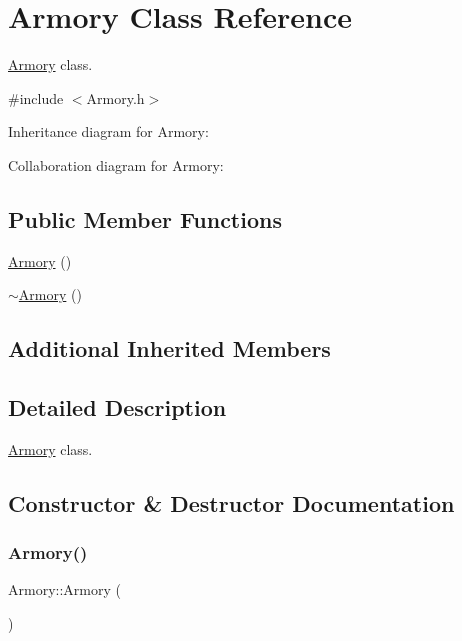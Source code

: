 \hypertarget{classArmory}{}\section{Armory Class Reference}
\label{classArmory}


\hyperlink{classArmory}{Armory} class.  




{\ttfamily \#include $<$Armory.\+h$>$}



Inheritance diagram for Armory\+:


Collaboration diagram for Armory\+:
\subsection*{Public Member Functions}
\begin{DoxyCompactItemize}
\item 
\hyperlink{classArmory_ad1d556c807fe5f3e5852cfbb818c4f1c}{Armory} ()
\item 
\hyperlink{classArmory_a4af8efb475734ef6292e5cdef489c9d9}{$\sim$\+Armory} ()
\end{DoxyCompactItemize}
\subsection*{Additional Inherited Members}


\subsection{Detailed Description}
\hyperlink{classArmory}{Armory} class. 

\subsection{Constructor \& Destructor Documentation}
\mbox{\label{classArmory_ad1d556c807fe5f3e5852cfbb818c4f1c}} 
\subsubsection{\texorpdfstring{Armory()}{Armory()}}
{\footnotesize\ttfamily Armory\+::\+Armory (\begin{DoxyParamCaption}{ }\end{DoxyParamCaption})}

